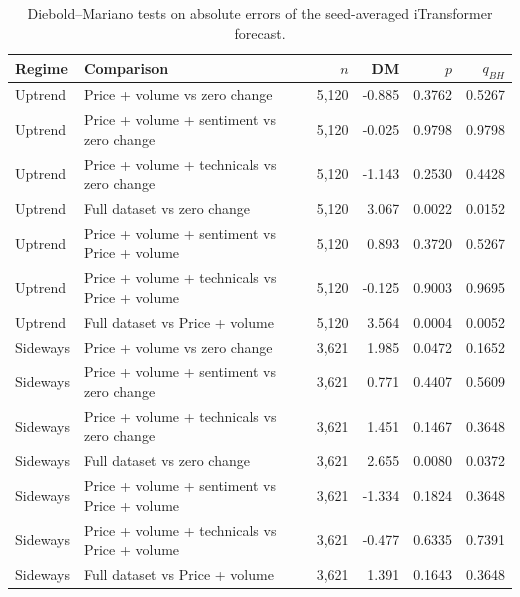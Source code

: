 \begin{table}[htbp]
\centering
\caption{Diebold--Mariano tests on absolute errors of the seed-averaged iTransformer forecast.}
\label{tab:itransformer_dm_oof}
\begin{tabular}{llrrrr}
\hline
Regime & Comparison & $n$ & DM & $p$ & $q_{BH}$ \\
\hline
        Uptrend & Price + volume vs zero change & 5,120 & -0.885 & 0.3762 & 0.5267 \\
        Uptrend & Price + volume + sentiment vs zero change & 5,120 & -0.025 & 0.9798 & 0.9798 \\
        Uptrend & Price + volume + technicals vs zero change & 5,120 & -1.143 & 0.2530 & 0.4428 \\
        Uptrend & Full dataset vs zero change & 5,120 & 3.067 & 0.0022 & 0.0152 \\
        Uptrend & Price + volume + sentiment vs Price + volume & 5,120 & 0.893 & 0.3720 & 0.5267 \\
        Uptrend & Price + volume + technicals vs Price + volume & 5,120 & -0.125 & 0.9003 & 0.9695 \\
        Uptrend & Full dataset vs Price + volume & 5,120 & 3.564 & 0.0004 & 0.0052 \\
        Sideways & Price + volume vs zero change & 3,621 & 1.985 & 0.0472 & 0.1652 \\
        Sideways & Price + volume + sentiment vs zero change & 3,621 & 0.771 & 0.4407 & 0.5609 \\
        Sideways & Price + volume + technicals vs zero change & 3,621 & 1.451 & 0.1467 & 0.3648 \\
        Sideways & Full dataset vs zero change & 3,621 & 2.655 & 0.0080 & 0.0372 \\
        Sideways & Price + volume + sentiment vs Price + volume & 3,621 & -1.334 & 0.1824 & 0.3648 \\
        Sideways & Price + volume + technicals vs Price + volume & 3,621 & -0.477 & 0.6335 & 0.7391 \\
        Sideways & Full dataset vs Price + volume & 3,621 & 1.391 & 0.1643 & 0.3648 \\
\hline
\end{tabular}
\end{table}
